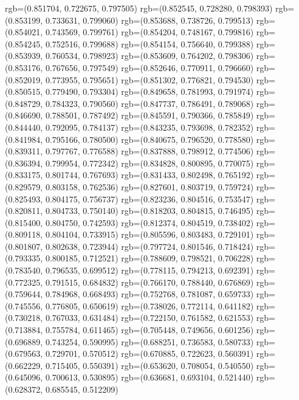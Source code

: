 {{{					rgb=(0.851704, 0.722675, 0.797505)
					rgb=(0.852545, 0.728280, 0.798393)
					rgb=(0.853199, 0.733631, 0.799060)
					rgb=(0.853688, 0.738726, 0.799513)
					rgb=(0.854021, 0.743569, 0.799761)
					rgb=(0.854204, 0.748167, 0.799816)
					rgb=(0.854245, 0.752516, 0.799688)
					rgb=(0.854154, 0.756640, 0.799388)
					rgb=(0.853939, 0.760534, 0.798923)
					rgb=(0.853609, 0.764202, 0.798306)
					rgb=(0.853176, 0.767656, 0.797549)
					rgb=(0.852646, 0.770911, 0.796660)
					rgb=(0.852019, 0.773955, 0.795651)
					rgb=(0.851302, 0.776821, 0.794530)
					rgb=(0.850515, 0.779490, 0.793304)
					rgb=(0.849658, 0.781993, 0.791974)
					rgb=(0.848729, 0.784323, 0.790560)
					rgb=(0.847737, 0.786491, 0.789068)
					rgb=(0.846690, 0.788501, 0.787492)
					rgb=(0.845591, 0.790366, 0.785849)
					rgb=(0.844440, 0.792095, 0.784137)
					rgb=(0.843235, 0.793698, 0.782352)
					rgb=(0.841984, 0.795166, 0.780500)
					rgb=(0.840675, 0.796520, 0.778580)
					rgb=(0.839311, 0.797767, 0.776588)
					rgb=(0.837888, 0.798912, 0.774506)
					rgb=(0.836394, 0.799954, 0.772342)
					rgb=(0.834828, 0.800895, 0.770075)
					rgb=(0.833175, 0.801744, 0.767693)
					rgb=(0.831433, 0.802498, 0.765192)
					rgb=(0.829579, 0.803158, 0.762536)
					rgb=(0.827601, 0.803719, 0.759724)
					rgb=(0.825493, 0.804175, 0.756737)
					rgb=(0.823236, 0.804516, 0.753547)
					rgb=(0.820811, 0.804733, 0.750140)
					rgb=(0.818203, 0.804815, 0.746495)
					rgb=(0.815400, 0.804750, 0.742593)
					rgb=(0.812374, 0.804519, 0.738402)
					rgb=(0.809118, 0.804104, 0.733915)
					rgb=(0.805596, 0.803483, 0.729101)
					rgb=(0.801807, 0.802638, 0.723944)
					rgb=(0.797724, 0.801546, 0.718424)
					rgb=(0.793335, 0.800185, 0.712521)
					rgb=(0.788609, 0.798521, 0.706228)
					rgb=(0.783540, 0.796535, 0.699512)
					rgb=(0.778115, 0.794213, 0.692391)
					rgb=(0.772325, 0.791515, 0.684832)
					rgb=(0.766170, 0.788440, 0.676869)
					rgb=(0.759644, 0.784968, 0.668493)
					rgb=(0.752768, 0.781087, 0.659733)
					rgb=(0.745556, 0.776805, 0.650619)
					rgb=(0.738026, 0.772114, 0.641182)
					rgb=(0.730218, 0.767033, 0.631484)
					rgb=(0.722150, 0.761582, 0.621553)
					rgb=(0.713884, 0.755784, 0.611465)
					rgb=(0.705448, 0.749656, 0.601256)
					rgb=(0.696889, 0.743254, 0.590995)
					rgb=(0.688251, 0.736583, 0.580733)
					rgb=(0.679563, 0.729701, 0.570512)
					rgb=(0.670885, 0.722623, 0.560391)
					rgb=(0.662229, 0.715405, 0.550391)
					rgb=(0.653620, 0.708054, 0.540550)
					rgb=(0.645096, 0.700613, 0.530895)
					rgb=(0.636681, 0.693104, 0.521440)
					rgb=(0.628372, 0.685545, 0.512209)
}}}
